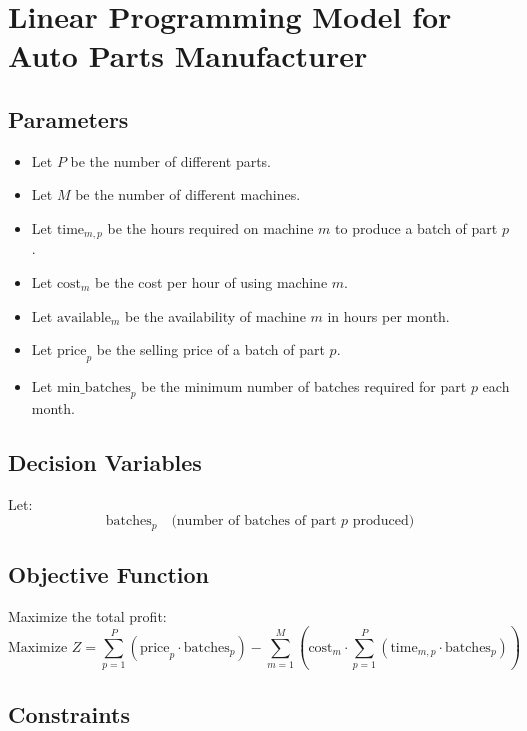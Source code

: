 \documentclass{article}
\begin{document}
\section*{Linear Programming Model for Auto Parts Manufacturer}

\subsection*{Parameters}
\begin{itemize}
    \item Let \( P \) be the number of different parts.
    \item Let \( M \) be the number of different machines.
    \item Let \( \text{time}_{m,p} \) be the hours required on machine \( m \) to produce a batch of part \( p \).
    \item Let \( \text{cost}_{m} \) be the cost per hour of using machine \( m \).
    \item Let \( \text{available}_{m} \) be the availability of machine \( m \) in hours per month.
    \item Let \( \text{price}_{p} \) be the selling price of a batch of part \( p \).
    \item Let \( \text{min\_batches}_{p} \) be the minimum number of batches required for part \( p \) each month.
\end{itemize}

\subsection*{Decision Variables}
Let:
\[
\text{batches}_{p} \quad \text{(number of batches of part } p \text{ produced)}
\]

\subsection*{Objective Function}
Maximize the total profit:
\[
\text{Maximize } Z = \sum_{p=1}^{P} (\text{price}_{p} \cdot \text{batches}_{p}) - \sum_{m=1}^{M} \left( \text{cost}_{m} \cdot \sum_{p=1}^{P} (\text{time}_{m,p} \cdot \text{batches}_{p}) \right)
\]

\subsection*{Constraints}
\end{document}

